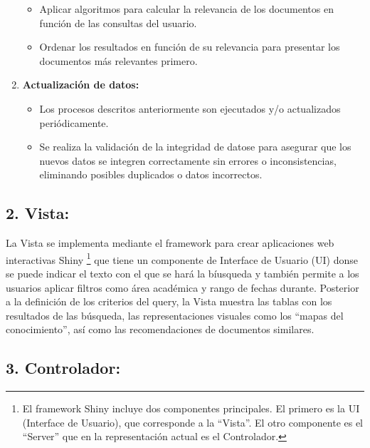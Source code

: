 \documentclass[
  10,
  openany]{book}
\begin{document}
\begin{enumerate}
  \begin{itemize}
  \item
    Aplicar algoritmos para calcular la relevancia de los documentos en función de las consultas del usuario.
  \item
    Ordenar los resultados en función de su relevancia para presentar los documentos más relevantes primero.
  \end{itemize}
\item
  \textbf{Actualización de datos:}

  \begin{itemize}
  \item
    Los procesos descritos anteriormente son ejecutados y/o actualizados periódicamente.
  \item
    Se realiza la validación de la integridad de datose para asegurar que los nuevos datos se integren correctamente sin errores o inconsistencias, eliminando posibles duplicados o datos incorrectos.
  \end{itemize}
\end{enumerate}

\hypertarget{vista}{%
\subsection{\texorpdfstring{\textbf{2. Vista:}}{2. Vista:}}\label{vista}}

La Vista se implementa mediante el framework para crear aplicaciones web interactivas Shiny \citep{shiny} \footnote{El framework Shiny incluye dos componentes principales. El primero es la UI (Interface de Usuario), que corresponde a la ``Vista''. El otro componente es el ``Server'' que en la representación actual es el Controlador.} que tiene un componente de Interface de Usuario (UI) donse se puede indicar el texto con el que se hará la bíusqueda y también permite a los usuarios aplicar filtros como área académica y rango de fechas durante. Posterior a la definición de los criterios del query, la Vista muestra las tablas con los resultados de las búsqueda, las representaciones visuales como los ``mapas del conocimiento'', así como las recomendaciones de documentos similares.

\hypertarget{controlador}{%
\subsection{\texorpdfstring{\textbf{3. Controlador:}}{3. Controlador:}}\label{controlador}}
\end{document}
